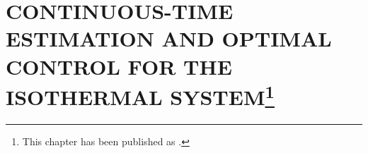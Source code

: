 \chapter[
    Continuous-time Estimation and Optimal Control for the Isothermal System
]{
    \MakeUppercase{Continuous-time Estimation and Optimal Control for the Isothermal System}\footnote{
        This chapter has been published as .
    }}
\label{ch:1}







